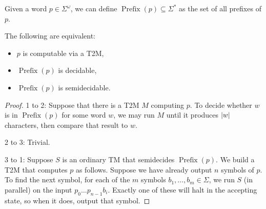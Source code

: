 Given a word $p \in \Sigma^\omega$, we can define $\operatorname{Prefix}(p)
\subseteq \Sigma^*$ as the set of all prefixes of $p$.

\begin{theorem}
  The following are equivalent:
  \begin{itemize}
  \item $p$ is computable via a T2M,
  \item $\operatorname{Prefix}(p)$ is decidable,
  \item $\operatorname{Prefix}(p)$ is semidecidable.
  \end{itemize}
\end{theorem}

\begin{proof}
  1 to 2:
  Suppose that there is a T2M $M$ computing $p$.
  To decide whether $w$ is in $\operatorname{Prefix}(p)$ for some word $w$, we
  may run $M$ until it produces $\left| w \right|$ characters, then compare that result
  to $w$.

  2 to 3:
  Trivial.

  3 to 1:
  Suppose $S$ is an ordinary TM that semidecides $\operatorname{Prefix}(p)$.
  We build a T2M that computes $p$ as follows.
  Suppose we have already output $n$ symbols of $p$.
  To find the next symbol, for each of the $m$ symbols $b_1, \ldots, b_m \in
  \Sigma$, we run $S$ (in parallel) on the input $p_0 \ldots p_{n-1} b_i$.
  Exactly one of these will halt in the accepting state, so when it does, output
  that symbol.
\end{proof}